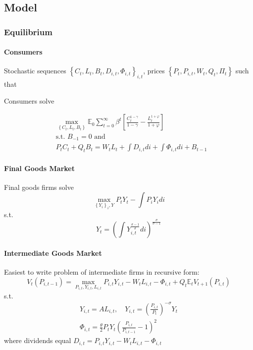 \documentclass[10pt]{article}
\begin{document}
\subsection{Model}

\subsubsection{Equilibrium}

\paragraph{Consumers}

Stochastic sequences $\left\{C_t, L_t, B_t, D_{i, t}, \Phi_{i, t}\right\}_{i, t}$, prices $\left\{P_t, P_{i, t}, W_t, Q_t, \Pi_t\right\}$ such that

Consumers solve

\begin{align}
    &\max _{\left\{C_t, L_t, B_t\right\}} \mathbb{E}_0 \sum_{t=0}^{\infty} \beta^t\left[\frac{C_t^{1-\gamma}}{1-\gamma}-\frac{L_t^{1+\varphi}}{1+\varphi}\right] \\
    & \text{s.t. } B_{-1}=0 \text{ and } \\
    & P_t C_t+Q_t B_t=W_t L_t+\int D_{i, t} d i+\int \Phi_{i, t} d i+B_{t-1}
\end{align}


\paragraph{Final Goods Market}

Final goods firms solve
$$
\max _{\left\{Y_i\right\}_i, Y} P_t Y_t-\int P_i Y_i d i
$$
s.t.
$$
Y_t=\left(\int Y_{i, t}^{\frac{\sigma-1}{\sigma}} d i\right)^{\frac{\sigma}{\sigma-1}}
$$

\paragraph{Intermediate Goods Market}

Easiest to write problem of intermediate firms in recursive form:
$$
V_t\left(P_{i, t-1}\right)=\max _{P_{i, t}, Y_{i, t}, L_{i, t}} P_{i, t} Y_{i, t}-W_t L_{i, t}-\Phi_{i, t}+Q_t \mathbb{E}_t V_{t+1}\left(P_{i, t}\right)
$$
s.t.
$$
\begin{gathered}
Y_{i, t}=A L_{i, t}, \quad Y_{i, t}=\left(\frac{P_{i, t}}{P_t}\right)^{-\sigma} Y_t \\
\Phi_{i, t}=\frac{\theta}{2} P_t Y_t\left(\frac{P_{i, t}}{P_{i, t-1}}-1\right)^2
\end{gathered}
$$
where dividends equal
$D_{i, t}=P_{i, t} Y_{i, t}-W_t L_{i, t}-\Phi_{i, t}$
\end{document}

